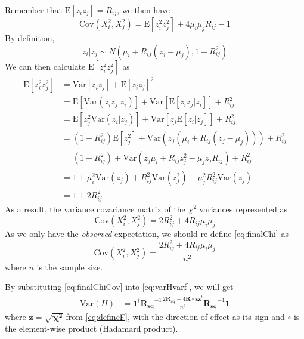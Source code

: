 			Remember that $\mathrm{E}[z_iz_j] = R_{ij}$, we then have
			$$
				\mathrm{Cov}(X_i^2, X_j^2)=\mathrm{E}[z_i^2z_j^2]+4\mu_i\mu_jR_{ij}-1
			$$
			By definition, 
			$$
				z_i|z_j\sim N(\mu_i+R_{ij}(z_j-\mu_j),1-R_{ij}^2)
			$$
			We can then calculate $\mathrm{E}[z_i^2z_j^2]$ as
			\begin{align*}
				\mathrm{E}[z_i^2z_j^2]&=\mathrm{Var}[z_iz_j]+\mathrm{E}[z_iz_j]^2\\
				&=\mathrm{E}[\mathrm{Var}(z_iz_j|z_i)]+\mathrm{Var}[\mathrm{E}[z_iz_j|z_i]]+R_{ij}^2\\
				&=\mathrm{E}[z_j^2\mathrm{Var}(z_i|z_j)]+\mathrm{Var}[z_j\mathrm{E}[z_i|z_j]]+R_{ij}^2\\
				&=(1-R_{ij}^2)\mathrm{E}[z_j^2]+\mathrm{Var}(z_j(\mu_i+R_{ij}(z_j-\mu_j)))+R_{ij}^2\\
				&=(1-R_{ij}^2)+\mathrm{Var}(z_j\mu_i+R_{ij}z_j^2-\mu_jz_jR_{ij})+R_{ij}^2\\
				&=1+\mu_i^2\mathrm{Var}(z_j)+R_{ij}^2\mathrm{Var}(z_j^2)-\mu_j^2R_{ij}^2\mathrm{Var}(z_j)\\
				&=1+2R_{ij}^2
			\end{align*}
			As a result, the variance covariance matrix of the $\chi^2$ variances represented as
			\begin{equation}
				\mathrm{Cov}(X_i^2,X_j^2) = 2R_{ij}^2+4R_{ij}\mu_i\mu_j
				\label{eq:finalChi}
			\end{equation}
			As we only have the \emph{observed} expectation, we should re-define \cref{eq:finalChi} as
			\begin{equation}
				\mathrm{Cov}(X_i^2,X_j^2) = \frac{2R_{ij}^2+4R_{ij}\mu_i\mu_j}{n^2}
				\label{eq:finalChiCov}
			\end{equation}
			where $n$ is the sample size.
			
			By substituting \cref{eq:finalChiCov} into \cref{eq:varHvarf}, we will get
			\begin{align}
				\mathrm{Var}(H) &=\boldsymbol{1}^t\boldsymbol{R_{sq}}^{-1}\frac{2\boldsymbol{R_{sq}}+4\boldsymbol{R}\circ \boldsymbol{zz}^t}{n^2}\boldsymbol{R_{sq}}^{-1}\boldsymbol{1}
				\label{eq:covH}
			\end{align}
			where $\boldsymbol{z} = \sqrt{\boldsymbol{\chi^2}}$ from \cref{eq:defineF}, with the direction of effect as its sign and $\circ$ is the element-wise product (Hadamard product).
			 
